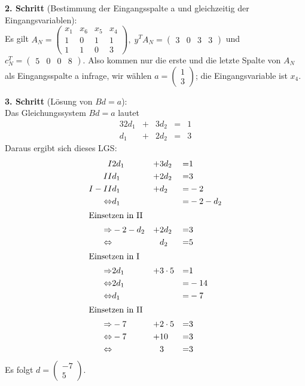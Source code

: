 \documentclass[10pt,a4paper,oneside,ngerman,numbers=noenddot]{scrartcl}
\begin{document}
		\textbf{2. Schritt} (Bestimmung der Eingangsspalte a und gleichzeitig der Eingangsvariablen):\\
		Es gilt $A_{N} = \begin{pmatrix} x_{1} & x_{6} & x_{5} & x_{4} \\ 1 & 0 & 1 & 1 \\ 1 & 1 & 0 & 3 \end{pmatrix},\; y^{T}A_{N} = \begin{pmatrix} 3 & 0 & 3 & 3 \end{pmatrix}$ und $c_{N}^{T} = \begin{pmatrix} 5 & 0 & 0 & 8\end{pmatrix}$. Also kommen nur die erste und die letzte Spalte von $A_{N}$ als Eingangsspalte a infrage, wir wählen $a = \begin{pmatrix} 1 \\ 3 \end{pmatrix}$; die Eingangsvariable ist $x_{4}$.
		
		\textbf{3. Schritt} (Lösung von $Bd = a$):\\
		Das Gleichungssystem $Bd = a$ lautet
		\begin{alignat*}{3}
			2d_{1} &+& 3d_{2} &=& 1\\
			d_{1} &+& 2d_{2} &=& 3
		\end{alignat*}
		Daraus ergibt sich dieses LGS:
		\begin{alignat*}{3}
			I & 2d_{1} &+& 3d_{2} &=& 1 \\
			II & d_{1} &+& 2d_{2} &=& 3 \\
			I - II & d_{1} &+& d_{2} &=& -2 \\
			\Leftrightarrow & d_{1} && &=& -2 - d_{2} \\
			\intertext{Einsetzen in II}
			\Rightarrow & -2 - d_{2} &+& 2d_{2} &=& 3 \\
			\Leftrightarrow & && d_{2} &=& 5 \\
			\intertext{Einsetzen in I}
			\Rightarrow & 2d_{1} &+& 3 \cdot 5 &=& 1 \\
			\Leftrightarrow & 2d_{1} && &=& - 14 \\
			\Leftrightarrow & d_{1} && &=& -7 \\
			\intertext{Einsetzen in II}
			\Rightarrow & -7 &+& 2 \cdot 5 &=& 3 \\
			\Leftrightarrow & -7 &+& 10 &=& 3 \\
			\Leftrightarrow & && 3 &=& 3
		\end{alignat*}
		Es folgt $d = \begin{pmatrix} -7 \\ 5 \end{pmatrix}$.
		
\end{document}
